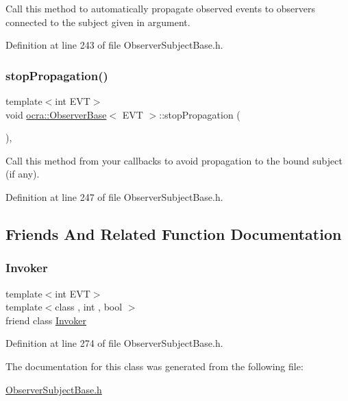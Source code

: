 Call this method to automatically propagate observed events to observers connected to the subject given in argument. 



Definition at line 243 of file Observer\+Subject\+Base.\+h.

\hypertarget{classocra_1_1ObserverBase_ace47225f3ec0cf9985a885b0a95588e0}{}\label{classocra_1_1ObserverBase_ace47225f3ec0cf9985a885b0a95588e0} 
\subsubsection{\texorpdfstring{stop\+Propagation()}{stopPropagation()}}
{\footnotesize\ttfamily template$<$int E\+VT$>$ \\
void \hyperlink{classocra_1_1ObserverBase}{ocra\+::\+Observer\+Base}$<$ E\+VT $>$\+::stop\+Propagation (\begin{DoxyParamCaption}{ }\end{DoxyParamCaption})\hspace{0.3cm}{\ttfamily [inline]}, {\ttfamily [protected]}}



Call this method from your callbacks to avoid propagation to the bound subject (if any). 



Definition at line 247 of file Observer\+Subject\+Base.\+h.



\subsection{Friends And Related Function Documentation}
\hypertarget{classocra_1_1ObserverBase_a63f148e01d4fc8e06b665e920abe3794}{}\label{classocra_1_1ObserverBase_a63f148e01d4fc8e06b665e920abe3794} 
\subsubsection{\texorpdfstring{Invoker}{Invoker}}
{\footnotesize\ttfamily template$<$int E\+VT$>$ \\
template$<$class , int , bool $>$ \\
friend class \hyperlink{classocra_1_1Invoker}{Invoker}\hspace{0.3cm}{\ttfamily [friend]}}



Definition at line 274 of file Observer\+Subject\+Base.\+h.



The documentation for this class was generated from the following file\+:\begin{DoxyCompactItemize}
\item 
\hyperlink{ObserverSubjectBase_8h}{Observer\+Subject\+Base.\+h}\end{DoxyCompactItemize}
